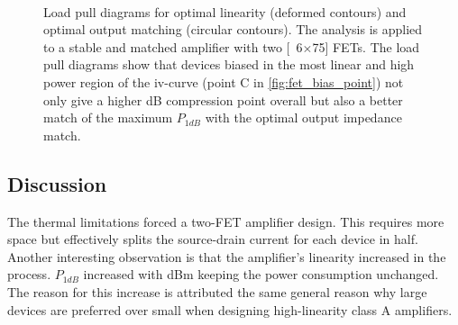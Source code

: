 				\begin{figure}[h!]
					\centering 
					 \\
					\caption[Load pull diagrams for IF amplifier 2.]{Load pull diagrams for optimal linearity (deformed contours) and optimal output matching (circular contours). The analysis is applied to a stable and matched amplifier with two \unit[6$\times$75]{\mum} FETs. The load pull diagrams show that devices biased in the most linear and high power region of the iv-curve (point C in \autoref{fig:fet_bias_point}) not only give a higher \unit[1]{dB} compression point overall but also a better match of the maximum $P_{1dB}$ with the optimal output impedance match.}\label{fig:if2lp}
				\end{figure}
				
		\subsection{Discussion}
			The thermal limitations forced a two-FET amplifier design. This requires more space but effectively splits the source-drain current for each device in half. Another interesting observation is that the amplifier's linearity increased in the process. $P_{1dB}$ increased with \unit[4]{dBm} keeping the power consumption unchanged. The reason for this increase is attributed the same general reason why large devices are preferred over small when designing high-linearity class A amplifiers.
			
